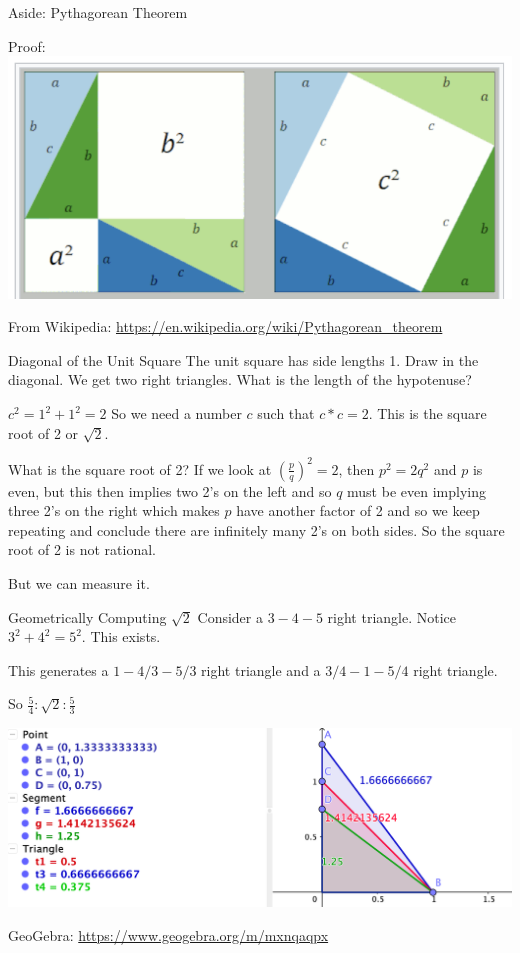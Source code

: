 \documentclass{beamer}
\begin{document}
\begin{frame}{Aside: Pythagorean Theorem}

    Proof:  \includegraphics[width=\textwidth]{Images/pythagoras-proof.png}

    From Wikipedia: \url{https://en.wikipedia.org/wiki/Pythagorean_theorem}
    
\end{frame}

\begin{frame}{Diagonal of the Unit Square}
    The unit square has side lengths 1. Draw in the diagonal. We get two right triangles. What is the length of the hypotenuse? 

    $c^2 = 1^2 + 1^2 = 2$  So we need a number $c$ such that $c*c = 2$. This is the square root of 2 or $\sqrt{2}$.

    What is the square root of 2?  If we look at $(\frac{p}{q})^2 = 2$, then $p^2 = 2q^2$ and $p$ is even, but this then implies two 2's on the left and so $q$ must be even implying three 2's on the right which makes $p$ have another factor of 2 and so we keep repeating and conclude there are infinitely many 2's on both sides. So the square root of 2 is not rational. 

    But we can measure it.
    
\end{frame}

\begin{frame}{Geometrically Computing $\sqrt{2}$}
    Consider a $3-4-5$ right triangle. Notice $3^2 + 4^2 = 5^2$. This exists. 

    This generates a $1 - 4/3 - 5/3$ right triangle and a $3/4 -1 - 5/4$ right triangle. 

    So  $\frac{5}{4} : \sqrt{2} : \frac{5}{3}$

    \includegraphics[width=\textwidth]{Images/pythagoras-sqrt-2.png}

    GeoGebra: \url{https://www.geogebra.org/m/mxnqaqpx}
    
\end{frame}
\end{document}
